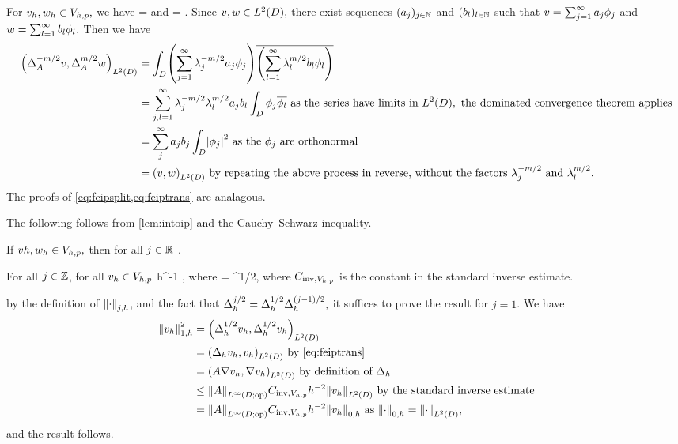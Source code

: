 \label{lem:intoip}
For $v_{h}, w_{h} \in V_{h,p},$ we have
\beq\label{eq:feipsplit}
\IPLtD{\Deltahmmt \vh}{\Deltahmt \wh} = \IPLtD{\vh}{\wh}
\eeq
and
\beq\label{eq:feiptrans}
\IPLtD{\Deltahmt \vh}{\Deltahmt \vh} =  .
\eeq
\ele
{}
Since $v,w \in \LtD,$ there exist sequences $(a_{j})_{j \in \mathbb N}$ and $(b_{l})_{l \in \mathbb N}$ such that $v = \sum_{j=1}^\infty a_{j}\phi_{j}$ and $w = \sum_{l=1}^\infty b_{l} \phi_{l}.$ Then we have
\begin{align*}
\IPLtD{\DeltaAmmt v}{\DeltaAmt w} &= \int_D \mleft(\sum_{j=1}^\infty\lambdaj^{-m/2} \aj\phij\mright)\overline{\mleft(\sum_{l=1}^\infty \lambdal^{m/2}\bsl \phil\mright)}\\
&= \sum_{j,l=1}^\infty \lambdaj^{-m/2} \lambdal^{m/2} \aj \bsl \int_D \phij \philbar \text{ as the series have limits in } \LtD, \text{ the dominated convergence theorem applies}\\
& =\sum_{j}^\infty \aj \bsj \int_D \abs{\phij}^2 \text{ as the } \phij \text{ are orthonormal}\\
&= \IPLtD{v}{w} \text{ by repeating the above process in reverse, without the factors } \lambdaj^{-m/2} \tand \lambdal^{m/2}.
\end{align*}
The proofs of \cref{eq:feipsplit,eq:feiptrans} are analagous.
\epf

The following  follows from \cref{lem:intoip} and the Cauchy--Schwarz inequality.

\label{cor:ipdiscbound}
If $vh, w_{h} \in V_{h,p},$ then for all $j \in \mathbb R$
\beqs
\IPLtD{\vh}{\wh} \leq \Njh{\vh}\Nmjh{\wh}.
\eeqs
\eco

\label{lem:inversediscrete}
For all $j \in \mathbb Z$, for all $v_{h} \in V_{h,p}$
\beqs
\Njh{\vh} \leq \Chinv h^{-1} \Njmoh{\vh},
\eeqs
where
\beqs
\Chinv = \CinvVhp {}^{1/2},
\eeqs
where $C_{\mathrm{inv},V_{h,p}}$ is the constant in the standard inverse estimate.
\ele

by the definition of $\Njh{\cdot}$, and the fact that $\Delta_{h}^{j/2} = \Delta_{h}^{1/2}\Delta_{h}^{(j-1)/2},$ it suffices to prove the result for $j=1$. We have
\begin{align*}
\Noh{\vh}^2 &= \IPLtD{\Deltahh \vh}{\Deltahh \vh}\\
&= \IPLtD{\Deltah \vh}{\vh} \text{ by \cref{eq:feiptrans}}\\
&= \IPLtD{A \grad \vh}{\grad \vh} \text{ by definition of } \Deltah\\
&\leq \NLiDop{A} \CinvVhp h^{-2} \NLtD{\vh} \text{ by the standard inverse estimate}\\
&= \NLiDop{A} \CinvVhp h^{-2} \Nzh{\vh} \text{ as } \Nzh{\cdot} = \NLtD{\cdot},
\end{align*}
and the result follows.
\epf

